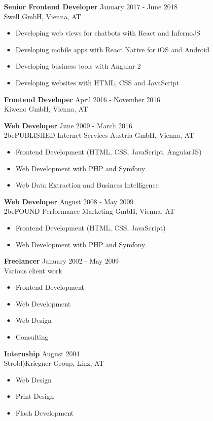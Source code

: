 \documentclass[margin]{res}
\begin{document}
\begin{resume}
\textbf{Senior Frontend Developer} \hfill January 2017 - June 2018 \\
  Swell GmbH, Vienna, AT
  \begin{itemize}
    \item Developing web views for chatbots with React and InfernoJS
    \item Developing mobile apps with React Native for iOS and Android
    \item Developing business tools with Angular 2
    \item Developing websites with HTML, CSS and JavaScript
  \end{itemize}

\textbf{Frontend Developer} \hfill April 2016 - November 2016 \\
  Kiweno GmbH, Vienna, AT

\textbf{Web Developer} \hfill June 2009 - March 2016 \\
  2bePUBLISHED Internet Services Austria GmbH, Vienna, AT
  \begin{itemize}  \itemsep -2pt %
    \item Frontend Development (HTML, CSS, JavaScript, AngularJS)
    \item Web Development with PHP and Symfony
    \item Web Data Extraction and Business Intelligence
  \end{itemize}

\textbf{Web Developer} \hfill August 2008 - May 2009 \\
  2beFOUND Performance Marketing GmbH, Vienna, AT
  \begin{itemize}  \itemsep -2pt
    \item Frontend Development (HTML, CSS, JavaScript)
    \item Web Development with PHP and Symfony
  \end{itemize}

\textbf{Freelancer} \hfill January 2002 - May 2009 \\
  Various client work
  \begin{itemize}  \itemsep -2pt
    \item Frontend Development
    \item Web Development
    \item Web Design
    \item Consulting
  \end{itemize}

\textbf{Internship} \hfill August 2004 \\
  Strobl)Kriegner Group, Linz, AT
  \begin{itemize}  \itemsep -2pt
    \item Web Design
    \item Print Design
    \item Flash Development
    \end{itemize}


\end{resume}
\end{document}
